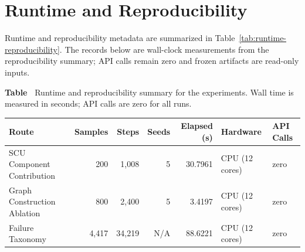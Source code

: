 \documentclass[a4paper,fleqn]{cas-sc}
\providecommand{\DIFaddtex}[1]{{\protect\color{blue}\uwave{#1}}} %
\providecommand{\DIFaddbegin}{} %
\providecommand{\DIFaddend}{} %
\providecommand{\DIFdelbegin}{} %
\providecommand{\DIFdelend}{} %
\providecommand{\DIFadd}[1]{\texorpdfstring{\DIFaddtex{#1}}{#1}} %
\providecommand{\DIFscaledelfig}{0.5}
\newlength{\DIFdelgraphicswidth} %
\newlength{\DIFdelgraphicsheight} %
\providecommand{\DIFaddincludegraphics}[2][]{{\color{blue}\fbox{\DIFOincludegraphics[#1]{#2}}}} %
\providecommand{\DIFdelincludegraphics}[2][]{%
\sbox{\DIFdelgraphicsbox}{\DIFOincludegraphics[#1]{#2}}%
\settoboxwidth{\DIFdelgraphicswidth}{\DIFdelgraphicsbox} %
\settoboxtotalheight{\DIFdelgraphicsheight}{\DIFdelgraphicsbox} %
\scalebox{\DIFscaledelfig}{%
\parbox[b]{\DIFdelgraphicswidth}{\usebox{\DIFdelgraphicsbox}\\[-\baselineskip] \rule{\DIFdelgraphicswidth}{0em}}\llap{\resizebox{\DIFdelgraphicswidth}{\DIFdelgraphicsheight}{%
\setlength{\unitlength}{\DIFdelgraphicswidth}%
\begin{picture}(1,1)%
\thicklines\linethickness{2pt} %
{\color[rgb]{1,0,0}\put(0,0){\framebox(1,1){}}}%
{\color[rgb]{1,0,0}\put(0,0){\line( 1,1){1}}}%
{\color[rgb]{1,0,0}\put(0,1){\line(1,-1){1}}}%
\end{picture}%
}\hspace*{3pt}}} %
} %
\DeclareRobustCommand{\DIFaddbegin}{\DIFOaddbegin \let\includegraphics\DIFaddincludegraphics} %
\DeclareRobustCommand{\DIFaddend}{\DIFOaddend \let\includegraphics\DIFOincludegraphics} %
\DeclareRobustCommand{\DIFdelbegin}{\DIFOdelbegin \let\includegraphics\DIFdelincludegraphics} %
\DeclareRobustCommand{\DIFdelend}{\DIFOaddend \let\includegraphics\DIFOincludegraphics} %
\begin{document}
\section{Runtime and Reproducibility}
\label{app:runtime-reproducibility}

Runtime and reproducibility metadata are summarized in Table~\ref{tab:runtime-reproducibility}. The records below are wall-clock measurements from the reproducibility summary; API calls remain zero and frozen artifacts are read-only inputs.

\par\medskip
{}\label{tab:runtime-reproducibility}
\noindent\textbf{Table~\thetable\DIFaddbegin \DIFadd{:}\DIFaddend } \DIFdelbegin %
\DIFdelend Runtime and reproducibility summary for the experiments. Wall time is measured in seconds; API calls are zero for all runs.
\begin{center}
\small
\begin{tabular}{lrrrrl l}
\toprule
Route & Samples & Steps & Seeds & Elapsed (s) & Hardware & API Calls \\
\midrule
SCU Component Contribution & 200 & 1,008 & 5 & 30.7961 & CPU (12 cores) & zero \\
Graph Construction Ablation & 800 & 2,400 & 5 & 3.4197 & CPU (12 cores) & zero \\
Failure Taxonomy & 4,417 & 34,219 & N/A & 88.6221 & CPU (12 cores) & zero \\
\bottomrule
\end{tabular}
\end{center}
\medskip
\end{document}
